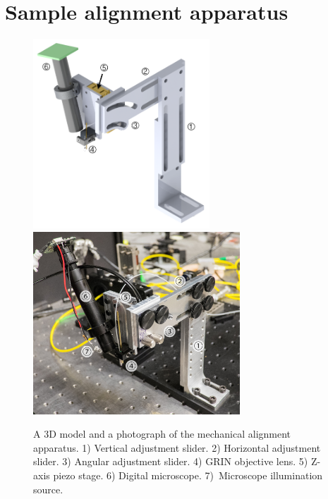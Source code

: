 
\section{Sample alignment apparatus}



\begin{figure}[h!]
\centering
\includegraphics[width=0.59\textwidth]{Images/Alignment/new_d_2_ann.png}
\\[0.8em]
\includegraphics[width=0.69\textwidth]{Images/Photographs/DSCF1696_an.jpg}
\caption[3D model and photograph of the mechanical alignment apparatus.]{A 3D model and a  photograph of the mechanical alignment apparatus. 1) Vertical adjustment slider. 2) Horizontal adjustment slider. 3) Angular adjustment slider. 4) GRIN objective lens. 5) Z-axis piezo stage. 6) Digital microscope. 7)~Microscope illumination source.\label{fig:alignment_overview}}
\end{figure}


